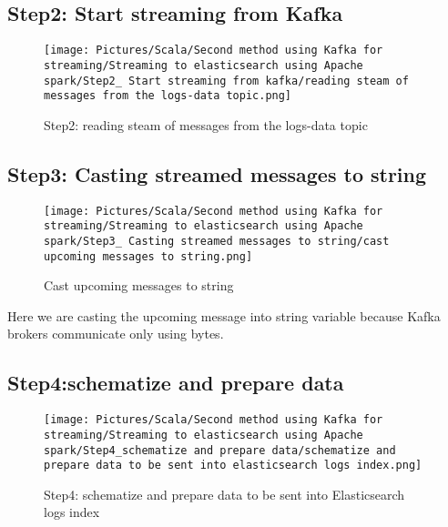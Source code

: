\begin{spacing}{1.2}
\subsection{Step2: Start streaming from Kafka}

\begin{figure}[!htb] 
\begin{center} 
\texttt{[image: Pictures/Scala/Second method using Kafka for streaming/Streaming to elasticsearch using Apache spark/Step2\_ Start streaming from kafka/reading steam of messages from the logs-data topic.png]}
\end{center} 
\label{fig:broker-Kafka-1}
\caption{Step2: reading steam of messages from the logs-data topic} 
\end{figure}  \FloatBarrier




\subsection{Step3: Casting streamed messages to string }

\begin{figure}[!htb] 
\begin{center} 
\texttt{[image: Pictures/Scala/Second method using Kafka for streaming/Streaming to elasticsearch using Apache spark/Step3\_ Casting streamed messages to string/cast upcoming messages to string.png]}
\end{center} 
\label{fig:broker-Kafka-1}
\caption{Cast upcoming messages to string} 
\end{figure}  \FloatBarrier
\par Here we are casting the upcoming message into string variable because Kafka brokers communicate only using bytes.


\subsection{Step4:schematize and prepare data}

\begin{figure}[!htb] 
\begin{center} 
\texttt{[image: Pictures/Scala/Second method using Kafka for streaming/Streaming to elasticsearch using Apache spark/Step4\_schematize and prepare data/schematize and prepare data to be sent into elasticsearch logs index.png]}
\end{center} 
\label{fig:broker-Kafka-1}
\caption{Step4: schematize and prepare data to be sent into Elasticsearch logs index} 
\end{figure}  \FloatBarrier



\end{spacing}
